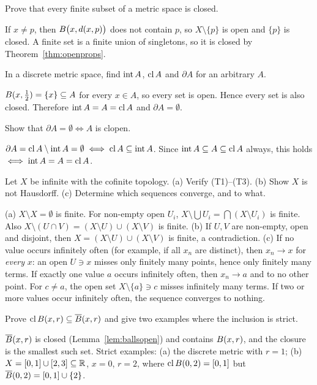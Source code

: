 \begin{exercise}\easy
Prove that every finite subset of a metric space is closed.
\end{exercise}
\begin{solution}
If $x\ne p$, then $B\bigl(x,d(x,p)\bigr)$ does not contain $p$, so $X\setminus\{p\}$ is open and $\{p\}$ is closed. A finite set is a finite union of singletons, so it is closed by Theorem~\ref{thm:openprops}.
\end{solution}

\begin{exercise}\medium
In a discrete metric space, find $\operatorname{int} A$, $\operatorname{cl} A$ and $\partial A$ for an arbitrary $A$.
\end{exercise}
\begin{solution}
$B(x,\tfrac12)=\{x\}\subseteq A$ for every $x\in A$, so every set is open. Hence every set is also closed. Therefore $\operatorname{int} A=A=\operatorname{cl} A$ and $\partial A=\emptyset$.
\end{solution}

\begin{exercise}\medium
Show that $\partial A=\emptyset\iff A$ is clopen.
\end{exercise}
\begin{solution}
$\partial A=\operatorname{cl} A\setminus\operatorname{int} A=\emptyset\iff\operatorname{cl} A\subseteq\operatorname{int} A$. Since $\operatorname{int} A\subseteq A\subseteq\operatorname{cl} A$ always, this holds $\iff\operatorname{int} A=A=\operatorname{cl} A$.
\end{solution}

\begin{exercise}\hard
Let $X$ be infinite with the cofinite topology. (a) Verify \textup{(T1)--(T3)}. (b) Show $X$ is not Hausdorff. (c) Determine which sequences converge, and to what.
\end{exercise}
\begin{solution}
(a) $X\setminus X=\emptyset$ is finite. For non-empty open $U_i$, $X\setminus\bigcup U_i=\bigcap(X\setminus U_i)$ is finite. Also $X\setminus(U\cap V)=(X\setminus U)\cup(X\setminus V)$ is finite.
(b) If $U,V$ are non-empty, open and disjoint, then $X=(X\setminus U)\cup(X\setminus V)$ is finite, a contradiction.
(c) If no value occurs infinitely often (for example, if all $x_n$ are distinct), then $x_n\to x$ for \emph{every} $x$: an open $U\ni x$ misses only finitely many points, hence only finitely many terms. If exactly one value $a$ occurs infinitely often, then $x_n\to a$ and to no other point. For $c\ne a$, the open set $X\setminus\{a\}\ni c$ misses infinitely many terms. If two or more values occur infinitely often, the sequence converges to nothing.
\end{solution}

\begin{exercise}\hard
Prove $\operatorname{cl}B(x,r)\subseteq\overline{B}(x,r)$ and give two examples where the inclusion is strict.
\end{exercise}
\begin{solution}
$\overline{B}(x,r)$ is closed (Lemma~\ref{lem:ballsopen}) and contains $B(x,r)$, and the closure is the smallest such set. Strict examples: (a) the discrete metric with $r=1$; (b) $X=[0,1]\cup[2,3]\subseteq\mathbb{R}$, $x=0$, $r=2$, where $\operatorname{cl}B(0,2)=[0,1]$ but $\overline{B}(0,2)=[0,1]\cup\{2\}$.
\end{solution}
